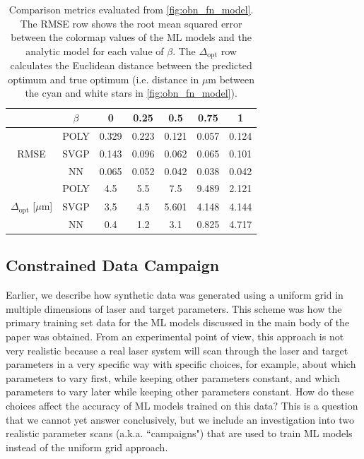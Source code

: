 \begin{table}
	\centering
	\begin{tabular}{|c||c|ccccc|}
		\hline
		&$\beta$   & 0        & 0.25     & 0.5      & 0.75     & 1        \\ 
		\hline
		& POLY & 0.329   & 0.223  & 0.121   & 0.057 & 0.124  \\
		RMSE & SVGP & 0.143  & 0.096 & 0.062 & 0.065 & 0.101  \\
		&NN   & 0.065 & 0.052 & 0.042 & 0.038 & 0.042 \\
		\hline 
		& POLY & 4.5 & 5.5  & 7.5     & 9.489  & 2.121 \\
		$\Delta_\text{opt}$ [$\mu$m] &SVGP & 3.5 & 4.5  & 5.601 & 4.148  & 4.144 \\
		&NN   & 0.4 & 1.2  & 3.1     & 0.825 & 4.717 \\
		\hline
	\end{tabular}
	\caption{Comparison metrics evaluated from \autoref{fig:obn_fn_model}. The RMSE row shows the root mean squared error between the colormap values of the ML models and the analytic model for each value of $\beta$. The $\Delta_\text{opt}$ row calculates the Euclidean distance between the predicted optimum and true optimum (i.e. distance in $\mu$m between the cyan and white stars in \autoref{fig:obn_fn_model}).}
	\label{tab:opt_results}
\end{table}
 
\subsection{Constrained Data Campaign}

Earlier, we describe how synthetic data was generated using a uniform grid in multiple dimensions of laser and target parameters. This scheme was how the primary training set data for the ML models discussed in the main body of the paper was obtained. From an experimental point of view, this approach is not very realistic because a real laser system will scan through the laser and target parameters in a very specific way with specific choices, for example, about which parameters to vary first, while keeping other parameters constant, and which parameters to vary later while keeping other parameters constant. How do these choices affect the accuracy of \gls{ML} models trained on this data? This is a question that we cannot yet answer conclusively, but we include an investigation into two realistic parameter scans (a.k.a. ``campaigns") that are used to train \gls{ML} models instead of the uniform grid approach.

